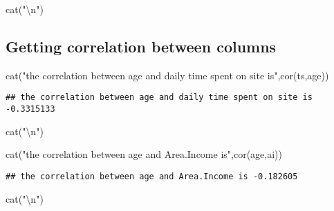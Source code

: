 \documentclass[
]{article}
\newenvironment{Shaded}{\begin{snugshade}}{\end{snugshade}}
\newcommand{\FunctionTok}[1]{\textcolor[rgb]{0.00,0.00,0.00}{#1}}
\newcommand{\NormalTok}[1]{#1}
\newcommand{\SpecialCharTok}[1]{\textcolor[rgb]{0.00,0.00,0.00}{#1}}
\newcommand{\StringTok}[1]{\textcolor[rgb]{0.31,0.60,0.02}{#1}}
\begin{document}
\begin{Shaded}
\begin{Highlighting}[]
\FunctionTok{cat}\NormalTok{(}\StringTok{"}\SpecialCharTok{\textbackslash{}n}\StringTok{"}\NormalTok{)}
\end{Highlighting}
\end{Shaded}

\hypertarget{getting-correlation-between-columns}{%
\subsection{Getting correlation between
columns}\label{getting-correlation-between-columns}}

\begin{Shaded}
\begin{Highlighting}[]
\FunctionTok{cat}\NormalTok{(}\StringTok{"the correlation between age and daily time spent on site is"}\NormalTok{,}\FunctionTok{cor}\NormalTok{(ts,age))}
\end{Highlighting}
\end{Shaded}

\begin{verbatim}
## the correlation between age and daily time spent on site is -0.3315133
\end{verbatim}

\begin{Shaded}
\begin{Highlighting}[]
\FunctionTok{cat}\NormalTok{(}\StringTok{"}\SpecialCharTok{\textbackslash{}n}\StringTok{"}\NormalTok{)}
\end{Highlighting}
\end{Shaded}

\begin{Shaded}
\begin{Highlighting}[]
\FunctionTok{cat}\NormalTok{(}\StringTok{"the correlation between age and Area.Income is"}\NormalTok{,}\FunctionTok{cor}\NormalTok{(age,ai))}
\end{Highlighting}
\end{Shaded}

\begin{verbatim}
## the correlation between age and Area.Income is -0.182605
\end{verbatim}

\begin{Shaded}
\begin{Highlighting}[]
\FunctionTok{cat}\NormalTok{(}\StringTok{"}\SpecialCharTok{\textbackslash{}n}\StringTok{"}\NormalTok{)}
\end{Highlighting}
\end{Shaded}
\end{document}
